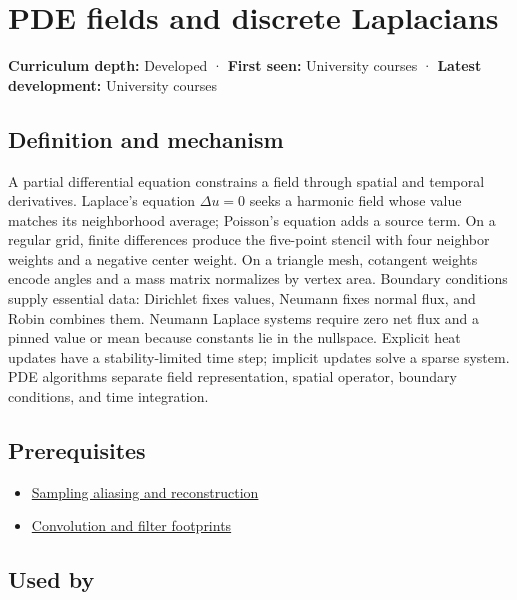 \hypertarget{appendix-1988d465c119}{}\label{referencestart:appendix-1988d465c119}
\section{PDE fields and discrete Laplacians}\label{appendix-1988d465c119-pde-fields-and-discrete-laplacians}

\textbf{Curriculum depth:} Developed · \textbf{First seen:} University courses · \textbf{Latest development:} University courses

\subsection{Definition and mechanism}\label{appendix-1988d465c119-definition-and-mechanism}

A partial differential equation constrains a field through spatial and temporal derivatives. Laplace's equation \(\Delta u=0\) seeks a harmonic field whose value matches its neighborhood average; Poisson's equation adds a source term. On a regular grid, finite differences produce the five-point stencil with four neighbor weights and a negative center weight. On a triangle mesh, cotangent weights encode angles and a mass matrix normalizes by vertex area. Boundary conditions supply essential data: Dirichlet fixes values, Neumann fixes normal flux, and Robin combines them. Neumann Laplace systems require zero net flux and a pinned value or mean because constants lie in the nullspace. Explicit heat updates have a stability-limited time step; implicit updates solve a sparse system. PDE algorithms separate field representation, spatial operator, boundary conditions, and time integration.

\subsection{Prerequisites}\label{appendix-1988d465c119-prerequisites}

\begin{itemize}
\tightlist
\item
  \hyperref[appendix-6a7869dd79a6]{Sampling aliasing and reconstruction}
\item
  \hyperref[appendix-d5b3c692d9f0]{Convolution and filter footprints}
\end{itemize}

\subsection{Used by}\label{appendix-1988d465c119-used-by}

